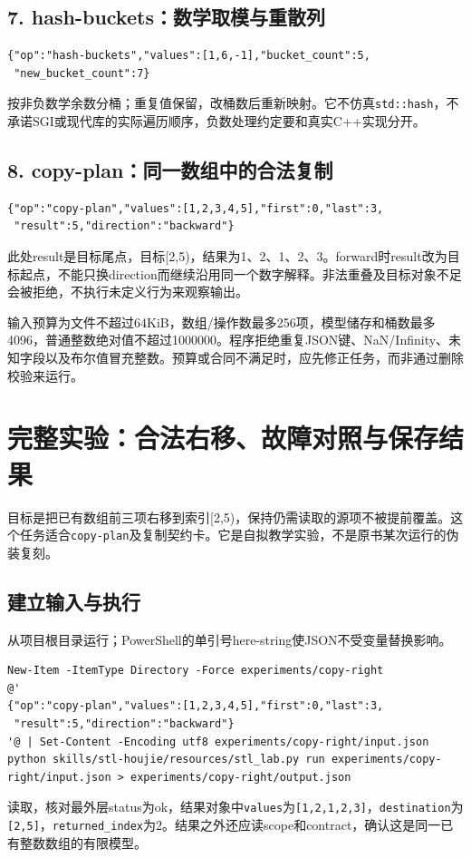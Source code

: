 \documentclass[11pt,a4paper,fontset=fandol]{ctexart}
\begin{document}
\subsection{7. hash-buckets：数学取模与重散列}
\begin{lstlisting}
{"op":"hash-buckets","values":[1,6,-1],"bucket_count":5,
 "new_bucket_count":7}
\end{lstlisting}
按非负数学余数分桶；重复值保留，改桶数后重新映射。它不仿真\texttt{std::hash}，不承诺SGI或现代库的实际遍历顺序，负数处理约定要和真实C++实现分开。

\subsection{8. copy-plan：同一数组中的合法复制}
\begin{lstlisting}
{"op":"copy-plan","values":[1,2,3,4,5],"first":0,"last":3,
 "result":5,"direction":"backward"}
\end{lstlisting}
此处result是目标尾点，目标[2,5)，结果为1、2、1、2、3。forward时result改为目标起点，不能只换direction而继续沿用同一个数字解释。非法重叠及目标对象不足会被拒绝，不执行未定义行为来观察输出。

输入预算为文件不超过64KiB，数组/操作数最多256项，模型储存和桶数最多4096，普通整数绝对值不超过1000000。程序拒绝重复JSON键、NaN/Infinity、未知字段以及布尔值冒充整数。预算或合同不满足时，应先修正任务，而非通过删除校验来运行。
\section{完整实验：合法右移、故障对照与保存结果}
目标是把已有数组前三项右移到索引[2,5)，保持仍需读取的源项不被提前覆盖。这个任务适合\texttt{copy-plan}及复制契约卡。它是自拟教学实验，不是原书某次运行的伪装复刻。

\subsection{建立输入与执行}
从项目根目录运行；PowerShell的单引号here-string使JSON不受变量替换影响。
\begin{lstlisting}
New-Item -ItemType Directory -Force experiments/copy-right
@'
{"op":"copy-plan","values":[1,2,3,4,5],"first":0,"last":3,
 "result":5,"direction":"backward"}
'@ | Set-Content -Encoding utf8 experiments/copy-right/input.json
python skills/stl-houjie/resources/stl_lab.py run experiments/copy-right/input.json > experiments/copy-right/output.json
\end{lstlisting}
读取，核对最外层status为ok，结果对象中\texttt{values}为\texttt{[1,2,1,2,3]}，\texttt{destination}为\texttt{[2,5]}，\texttt{returned\_index}为2。结果之外还应读scope和contract，确认这是同一已有整数数组的有限模型。
\end{document}
